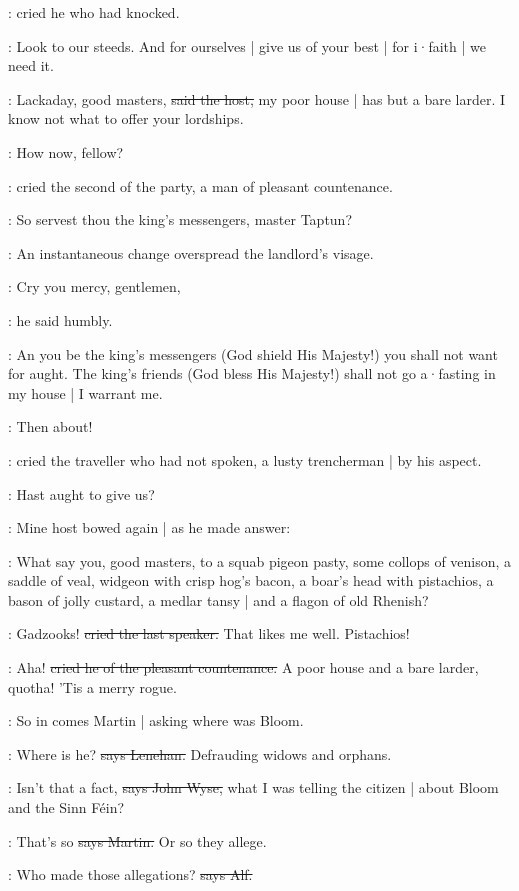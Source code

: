 :
cried he who had knocked.

\cunningham:
Look to our steeds.
And for ourselves |
give us of your best |
for i·faith |
we need it.

\terry:
Lackaday,
good masters,
\sout{said the host,}
my poor house |
has but a bare larder.
I know not what to offer your lordships.

\power:
How now,
fellow?

:
cried the second of the party,
a man of pleasant countenance.

\power:
So servest thou the king's messengers,
master Taptun?

:
An instantaneous change overspread the landlord's visage.

\terry:
Cry you mercy,
gentlemen,

:
he said humbly.

\terry:
An you be the king's messengers
(God shield His Majesty!)
you shall not want for aught.
The king's friends
(God bless His Majesty!)
shall not go a·fasting in my house |
I warrant me.

\crofton:
Then about!

:
cried the traveller who had not spoken,
a lusty trencherman |
by his aspect.

\crofton:
Hast aught to give us?

:
Mine host bowed again |
as he made answer:

\terry:
What say you,
good masters,
to a squab pigeon pasty,
some collops of venison,
a saddle of veal,
widgeon with crisp hog's bacon,
a boar's head with pistachios,
a bason of jolly custard,
a medlar tansy |
and a flagon of old Rhenish?

\crofton:
Gadzooks!
\sout{cried the last speaker.}
That likes me well.
Pistachios!

\power:
Aha!
\sout{cried he of the pleasant countenance.}
A poor house and a bare larder,
quotha!
'Tis a merry rogue.

\Nq:
So in comes Martin |
asking where was Bloom.

\lenehan:
Where is he?
\sout{says Lenehan.}
Defrauding widows and orphans.

\johnwyse:
Isn't that a fact,
\sout{says John Wyse,}
what I was telling the citizen |
about Bloom and the Sinn Féin?

\cunningham:
That's so
\sout{says Martin.}
Or so they allege.

\bergan:
Who made those allegations?
\sout{says Alf.}


